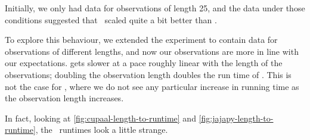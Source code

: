 Initially, we only had data for observations of length 25, and the data under those conditions suggested that \Jajapy\ scaled quite a bit better than \Cupaal.




To explore this behaviour, we extended the experiment to contain data for observations of different lengths, and now our observations are more in line with our expectations.
\Jajapy gets slower at a pace roughly linear with the length of the observations; doubling the observation length doubles the run time of \Jajapy.
This is not the case for \Cupaal, where we do not see any particular increase in running time as the observation length increases.

In fact, looking at \autoref{fig:cupaal-length-to-runtime} and \autoref{fig:jajapy-length-to-runtime}, the \Cupaal\ runtimes look a little strange.


